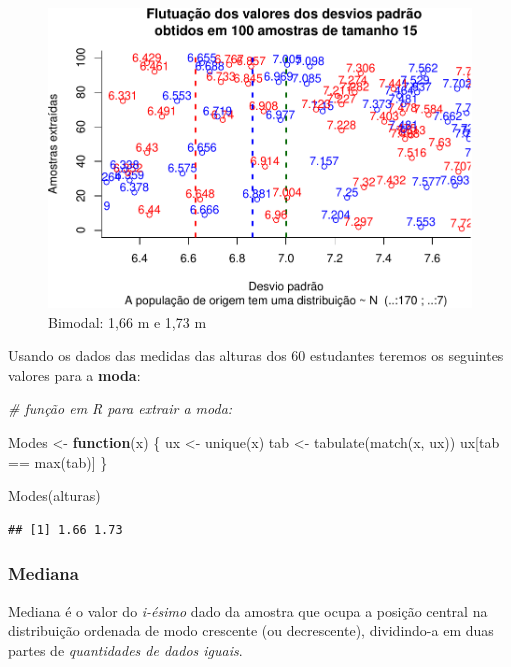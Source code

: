 \documentclass[
]{book}
\newenvironment{Shaded}{\begin{snugshade}}{\end{snugshade}}
\newcommand{\CommentTok}[1]{\textcolor[rgb]{0.56,0.35,0.01}{\textit{#1}}}
\newcommand{\ControlFlowTok}[1]{\textcolor[rgb]{0.13,0.29,0.53}{\textbf{#1}}}
\newcommand{\FunctionTok}[1]{\textcolor[rgb]{0.00,0.00,0.00}{#1}}
\newcommand{\NormalTok}[1]{#1}
\newcommand{\OtherTok}[1]{\textcolor[rgb]{0.56,0.35,0.01}{#1}}
\newcommand{\SpecialCharTok}[1]{\textcolor[rgb]{0.00,0.00,0.00}{#1}}
\begin{document}
\begin{figure}
\centering
\includegraphics{apostila_files/figure-latex/unnamed-chunk-37-1.pdf}
\caption{\label{fig:unnamed-chunk-37}Bimodal: 1,66 m e 1,73 m}
\end{figure}

Usando os dados das medidas das alturas dos 60 estudantes teremos os seguintes valores para a \textbf{moda}:

\begin{Shaded}
\begin{Highlighting}[]
\CommentTok{\# função em R para extrair a moda:}

\NormalTok{Modes }\OtherTok{\textless{}{-}} \ControlFlowTok{function}\NormalTok{(x) \{}
\NormalTok{  ux }\OtherTok{\textless{}{-}} \FunctionTok{unique}\NormalTok{(x)}
\NormalTok{  tab }\OtherTok{\textless{}{-}} \FunctionTok{tabulate}\NormalTok{(}\FunctionTok{match}\NormalTok{(x, ux))}
\NormalTok{  ux[tab }\SpecialCharTok{==} \FunctionTok{max}\NormalTok{(tab)]}
\NormalTok{\}}

\FunctionTok{Modes}\NormalTok{(alturas)}
\end{Highlighting}
\end{Shaded}

\begin{verbatim}
## [1] 1.66 1.73
\end{verbatim}

\hypertarget{mediana}{%
\subsubsection{Mediana}\label{mediana}}

Mediana é o valor do \emph{i-ésimo} dado da amostra que ocupa a posição central na distribuição ordenada de modo crescente (ou decrescente), dividindo-a em duas partes de \emph{quantidades de dados iguais}.
\end{document}
